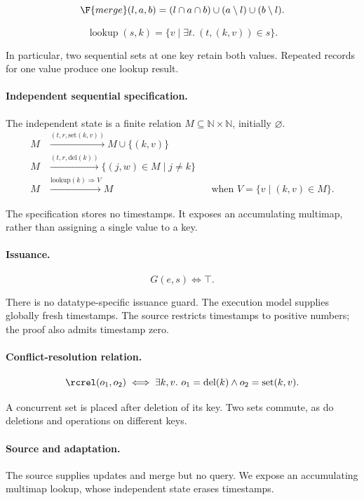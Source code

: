 \[
\F{merge}(l,a,b)=(l\cap a\cap b)\cup(a\setminus l)\cup(b\setminus l).
\]

\[
\operatorname{lookup}(s,k)=\{v\mid\exists t.\ (t,(k,v))\in s\}.
\]

In particular, two sequential sets at one key retain both values. Repeated records for one value produce one lookup result.


\paragraph{Independent sequential specification.}
The independent state is a finite relation $M\subseteq\mathbb N\times\mathbb N$, initially $\varnothing$.
\[
\begin{aligned}
M&\xrightarrow{(t,r,\mathrm{set}(k,v))}M\cup\{(k,v)\}\\
M&\xrightarrow{(t,r,\mathrm{del}(k))}\{(j,w)\in M\mid j\ne k\}\\
M&\xrightarrow{\mathrm{lookup}(k)\Rightarrow V}M&&\text{when }V=\{v\mid(k,v)\in M\}.
\end{aligned}
\]

The specification stores no timestamps. It exposes an accumulating multimap, rather than assigning a single value to a key.


\paragraph{Issuance.}
\[
G(e,s)\iff\top.
\]

There is no datatype-specific issuance guard. The execution model supplies globally fresh timestamps. The source restricts timestamps to positive numbers; the proof also admits timestamp zero.


\paragraph{Conflict-resolution relation.}
\[
\rcrel(o_1,o_2)\iff\exists k,v.\ o_1=\mathrm{del}(k)\land o_2=\mathrm{set}(k,v).
\]

A concurrent set is placed after deletion of its key. Two sets commute, as do deletions and operations on different keys.


\paragraph{Source and adaptation.}
The source supplies updates and merge but no query. We expose an accumulating multimap lookup, whose independent state erases timestamps.


